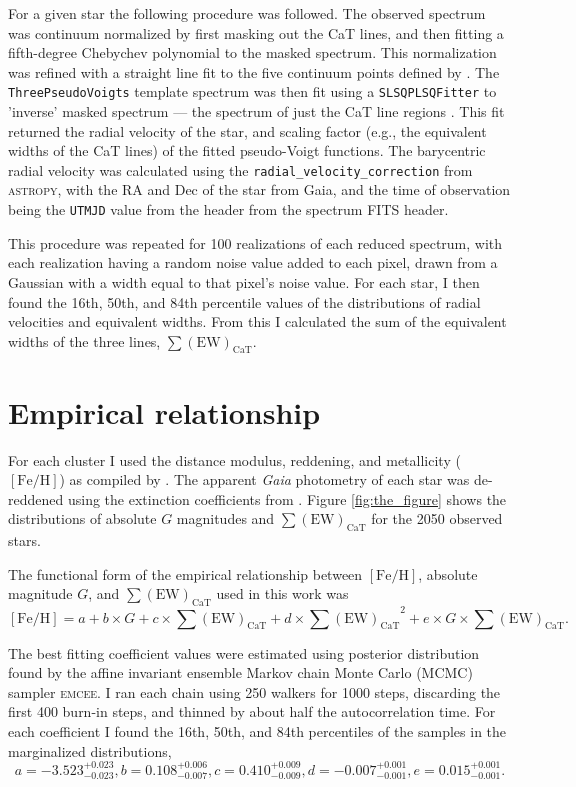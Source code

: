 \documentclass[RNAAS]{aastex63}
\newcommand{\feh}{\ensuremath{[\textrm{Fe}/\textrm{H}]}\xspace}
\newcommand{\sumcat}{\ensuremath{\sum{(\mathrm{EW})_\mathrm{CaT}}}\xspace}
\newcommand{\gaia}{\textit{Gaia}\xspace}
\begin{document}
For a given star the following procedure was followed. The observed spectrum was continuum normalized by first masking out the CaT lines, and then fitting a fifth-degree Chebychev polynomial to the masked spectrum. This normalization was refined with a straight line fit to the five continuum points defined by \citet{Carrera2013}. The \texttt{ThreePseudoVoigts} template spectrum was then fit using a \texttt{SLSQPLSQFitter} to 'inverse' masked spectrum --- the spectrum of just the CaT line regions \citep[defined by][]{Carrera2013}. This fit returned the radial velocity of the star, and scaling factor (e.g., the equivalent widths of the CaT lines) of the fitted pseudo-Voigt functions. The barycentric radial velocity was calculated using the \texttt{radial\_velocity\_correction} from \textsc{astropy}, with the RA and Dec of the star from Gaia, and the time of observation being the \texttt{UTMJD} value from the header from the spectrum FITS header.

This procedure was repeated for 100 realizations of each reduced spectrum, with each realization having a random noise value added to each pixel, drawn from a Gaussian with a width equal to that pixel's noise value. For each star, I then found the 16th, 50th, and 84th percentile values of the distributions of radial velocities and equivalent widths. From this I calculated the sum of the equivalent widths of the three lines, \sumcat.

\section{Empirical relationship}
For each cluster I used the distance modulus, reddening, and metallicity (\feh) as compiled by \citet{Usher2019}. The apparent \gaia photometry of each star was de-reddened using the extinction coefficients from \citet{GaiaCollaboration2018b}. Figure \ref{fig:the_figure} shows the distributions of absolute $G$ magnitudes and \sumcat for the 2050 observed stars.

The functional form of the empirical relationship between \feh, absolute magnitude $G$, and \sumcat used in this work was
\begin{equation}\label{eq:fit}
	\feh = a + b\times G + c\times\sumcat + d\times\sumcat^2 + e\times G\times\sumcat.
\end{equation}

The best fitting coefficient values were estimated using posterior distribution found by the affine invariant ensemble Markov chain Monte Carlo (MCMC) sampler \textsc{emcee}. I ran each chain using 250 walkers for 1000 steps, discarding the first 400 burn-in steps, and thinned by about half the autocorrelation time. For each coefficient I found the 16th, 50th, and 84th percentiles of the samples in the marginalized distributions,
\begin{equation}
	a=-3.523_{-0.023}^{+0.023}, b=0.108_{-0.007}^{+0.006}, c=0.410_{-0.009}^{+0.009}, d=-0.007_{-0.001}^{+0.001},e=0.015_{-0.001}^{+0.001}.
\end{equation}
\end{document}
